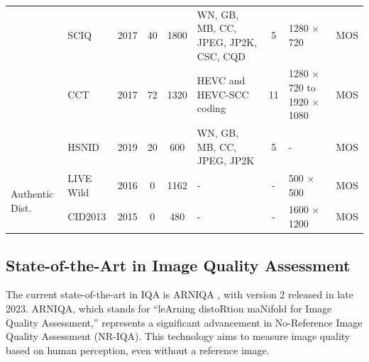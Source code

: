 \begin{table}[!t]
{\begin{tabular}{p{2.3cm} p{2cm} c c c p{3.5cm} c  p{2.3cm} c}
        & SCIQ & 2017 & 40 & 1800 & WN, GB, MB, CC, JPEG, JP2K, CSC, CQD& 5 & 1280 $\times$ 720 & MOS \\
        & CCT & 2017 & 72 & 1320 & HEVC and HEVC-SCC coding& 11 & 1280 $\times$ 720 to 1920 $\times$ 1080 & MOS \\
        & HSNID & 2019 & 20 & 600 & WN, GB, MB, CC, JPEG, JP2K& 5 &  - & MOS \\
        \hline
        \multirow{2}{*}{Authentic Dist.} 
        & LIVE Wild & 2016 & 0 & 1162 & - & - & 500 $\times$ 500 & MOS \\
        & CID2013 & 2015 & 0 & 480 & - & - & 1600 $\times$ 1200 & MOS \\
    \bottomrule
    \end{tabular}
    }
    \raggedright
\end{table}


\subsection{State-of-the-Art in Image Quality Assessment}
\label{sub:SOTA_IQA}
The current state-of-the-art in IQA is ARNIQA \autocite{ARNIQA}, with version 2 released in late 2023. ARNIQA, which stands for “leArning distoRtion maNifold for Image Quality Assessment,” represents a significant advancement in No-Reference Image Quality Assessment (NR-IQA). This technology aims to measure image quality based on human perception, even without a reference image. \par
\vspace{\baselineskip}
\vspace{\baselineskip}
\vspace{\baselineskip}
\vspace{\baselineskip}

